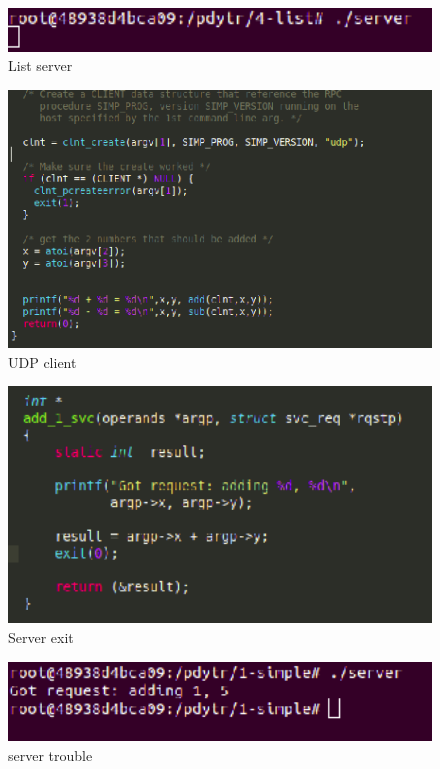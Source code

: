 \documentclass[12pt,journal,compsoc]{IEEEtran}
\begin{document}
\begin{figure}[H]
\centering
\includegraphics[width=125mm]{capturas/4-list-server.png}
\caption{List server}
\label{fig:4-list-server}
\end{figure}

\begin{figure}[H]
\centering
\includegraphics[width=125mm]{capturas/udp-client.png}
\caption{UDP client}
\label{fig:udp-client}
\end{figure}

\begin{figure}[H]
\centering
\includegraphics[width=125mm]{capturas/exit-to-server.png}
\caption{Server exit}
\label{fig:exit-to-server}
\end{figure}

\begin{figure}[H]
\centering
\includegraphics[width=125mm]{capturas/server-trouble.png}
\caption{server trouble}
\label{fig:server-trouble}
\end{figure}
\end{document}
